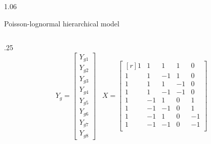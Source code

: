 \documentclass[final]{beamer}
\newlength{\twocolwid}
\newlength{\threecolwid}
\begin{document}
\begin{frame}
\begin{columns}[t,totalwidth=\threecolwid]
\begin{column}{1.06\twocolwid}
\begin{alertblock}{Poisson-lognormal hierarchical model}
\begin{columns}[t, totalwidth = \twocolwid]
\begin{column}{.25\twocolwid}
\[
Y_g =  \begin{bmatrix} Y_{g1}\\Y_{g2}\\ Y_{g3}\\Y_{g4}\\ Y_{g5}\\Y_{g6}\\ Y_{g7}\\Y_{g8} \end{bmatrix}
\;\;\;
X = 
\begin{bmatrix*}[r]
1&  1&   1&   1&   0 \\
1&  1&  -1&   1&   0 \\
1&  1&   1&  -1&   0 \\
1&  1&  -1&  -1&   0 \\
1& -1&   1&   0&   1 \\
1& -1&  -1&   0&   1 \\
1& -1&   1&   0&  -1 \\
1& -1&  -1&   0&  -1 \\
\end{bmatrix*}
\]
\end{column}


\end{columns}
\end{alertblock}
\end{column}
\end{columns}
\end{frame}
\end{document}
